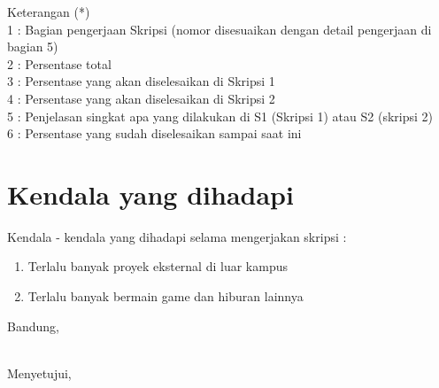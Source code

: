 \documentclass[a4paper,twoside]{article}
\begin{document}
Keterangan (*)\\
1 : Bagian pengerjaan Skripsi (nomor disesuaikan dengan detail pengerjaan di bagian 5)\\
2 : Persentase total \\
3 : Persentase yang akan diselesaikan di Skripsi 1 \\
4 : Persentase yang akan diselesaikan di Skripsi 2 \\
5 : Penjelasan singkat apa yang dilakukan di S1 (Skripsi 1) atau S2 (skripsi 2)\\
6 : Persentase yang sudah diselesaikan sampai saat ini 

\section{Kendala yang dihadapi}
Kendala - kendala yang dihadapi selama mengerjakan skripsi : 
\begin{enumerate}
\item Terlalu banyak proyek eksternal di luar kampus
\item Terlalu banyak bermain game dan hiburan lainnya
\end{enumerate}

\vspace{1cm}
\centering Bandung, \tanggal\\
\vspace{2cm} \nama \\ 
\vspace{1cm}

Menyetujui, \\
\end{document}
